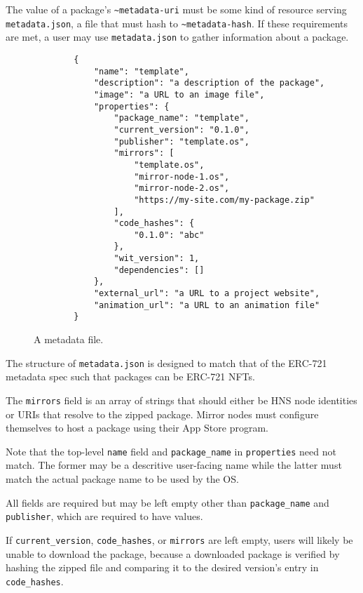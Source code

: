 \documentclass[runningheads]{llncs}
\begin{document}
The value of a package's \verb|~metadata-uri| must be some kind of resource serving \verb|metadata.json|, a file that must hash to \verb|~metadata-hash|.
If these requirements are met, a user may use \verb|metadata.json| to gather information about a package.

\begin{figure}[H]
    \centering
    \begin{verbatim}
        {
            "name": "template",
            "description": "a description of the package",
            "image": "a URL to an image file",
            "properties": {
                "package_name": "template",
                "current_version": "0.1.0",
                "publisher": "template.os",
                "mirrors": [
                    "template.os",
                    "mirror-node-1.os",
                    "mirror-node-2.os",
                    "https://my-site.com/my-package.zip"
                ],
                "code_hashes": {
                    "0.1.0": "abc"
                },
                "wit_version": 1,
                "dependencies": []
            },
            "external_url": "a URL to a project website",
            "animation_url": "a URL to an animation file"
        }
    \end{verbatim}
    \caption{A metadata file.}
    \label{fig:example metadata.json}
\end{figure}

The structure of \verb|metadata.json| is designed to match that of the ERC-721 metadata spec such that packages can be ERC-721 NFTs.

The \verb|mirrors| field is an array of strings that should either be HNS node identities or URIs that resolve to the zipped package.
Mirror nodes must configure themselves to host a package using their App Store program.

Note that the top-level \verb|name| field and \verb|package_name| in \verb|properties| need not match. The former may be a descritive user-facing name while the latter must match the actual package name to be used by the OS.

All fields are required but may be left empty other than \verb|package_name| and \verb|publisher|, which are required to have values.

If \verb|current_version|, \verb|code_hashes|, or \verb|mirrors| are left empty, users will likely be unable to download the package, because a downloaded package is verified by hashing the zipped file and comparing it to the desired version's entry in \verb|code_hashes|.
\end{document}
